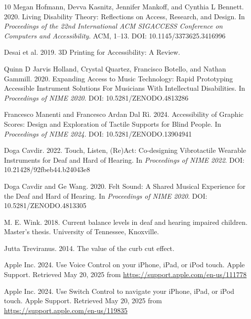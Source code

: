 \documentclass[sigconf]{nimeart}
\begin{document}
\begin{thebibliography}{10}
Megan Hofmann, Devva Kasnitz, Jennifer Mankoff, and Cynthia L Bennett. 2020.
Living Disability Theory: Reflections on Access, Research, and Design.
In \textit{Proceedings of the 22nd International ACM SIGACCESS Conference on Computers and Accessibility}.
ACM, 1--13.
DOI: 10.1145/3373625.3416996

Desai et al. 2019.
3D Printing for Accessibility: A Review.

Quinn D Jarvis Holland, Crystal Quartez, Francisco Botello, and Nathan Gammill. 2020.
Expanding Access to Music Technology: Rapid Prototyping Accessible Instrument Solutions For Musicians With Intellectual Disabilities.
In \textit{Proceedings of NIME 2020}.
DOI: 10.5281/ZENODO.4813286

Francesco Manenti and Francesco Ardan Dal Rì. 2024.
Accessibility of Graphic Scores: Design and Exploration of Tactile Supports for Blind People.
In \textit{Proceedings of NIME 2024}.
DOI: 10.5281/ZENODO.13904941

Doga Cavdir. 2022.
Touch, Listen, (Re)Act: Co-designing Vibrotactile Wearable Instruments for Deaf and Hard of Hearing.
In \textit{Proceedings of NIME 2022}.
DOI: 10.21428/92fbeb44.b24043e8

Doga Cavdir and Ge Wang. 2020.
Felt Sound: A Shared Musical Experience for the Deaf and Hard of Hearing.
In \textit{Proceedings of NIME 2020}.
DOI: 10.5281/ZENODO.4813305

M. E. Wink. 2018.
Current balance levels in deaf and hearing impaired children.
Master's thesis. University of Tennessee, Knoxville.

Jutta Treviranus. 2014.
The value of the curb cut effect.

Apple Inc. 2024.
Use Voice Control on your iPhone, iPad, or iPod touch.
Apple Support.
Retrieved May 20, 2025 from \url{https://support.apple.com/en-us/111778}

Apple Inc. 2024.
Use Switch Control to navigate your iPhone, iPad, or iPod touch.
Apple Support.
Retrieved May 20, 2025 from \url{https://support.apple.com/en-us/119835}


\end{thebibliography}
\end{document}

